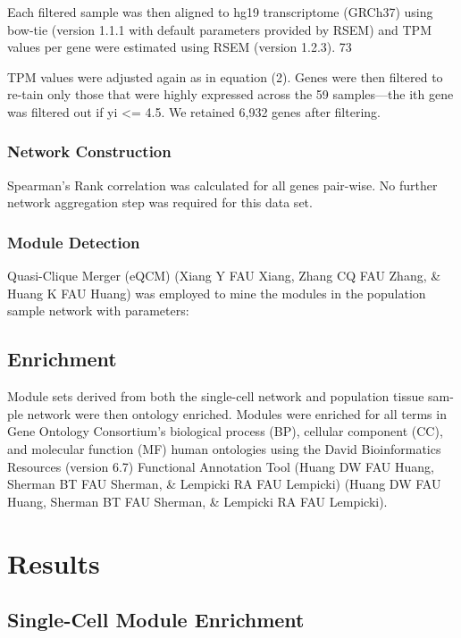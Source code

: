 \documentclass[11pt,twoside,a4paper]{article}
\begin{document}
Each filtered sample was then aligned to hg19 transcriptome (GRCh37) using bow-tie (version 1.1.1 with default parameters provided by RSEM) and TPM values per gene were estimated using RSEM (version 1.2.3). 73%

TPM values were adjusted again as in equation (2). Genes were then filtered to re-tain only those that were highly expressed across the 59 samples—the ith gene was filtered out if yi <= 4.5. We retained 6,932 genes after filtering.
\subsubsection{Network Construction}

Spearman’s Rank correlation was calculated for all genes pair-wise. No further network aggregation step was required for this data set. 

\subsubsection{Module Detection}

Quasi-Clique Merger (eQCM) (Xiang Y FAU Xiang, Zhang CQ FAU Zhang, \& Huang K FAU Huang) was employed to mine the modules in the population sample network with parameters:

\subsection{Enrichment}

Module sets derived from both the single-cell network and population tissue sam-ple network were then ontology enriched. Modules were enriched for all terms in Gene Ontology Consortium’s biological process (BP), cellular component (CC), and molecular function (MF) human ontologies using the David Bioinformatics Resources (version 6.7) Functional Annotation Tool (Huang DW FAU Huang, Sherman BT FAU Sherman, \& Lempicki RA FAU Lempicki) (Huang DW FAU Huang, Sherman BT FAU Sherman, \& Lempicki RA FAU Lempicki).

\section{Results}
\subsection{Single-Cell Module Enrichment}
\end{document}
